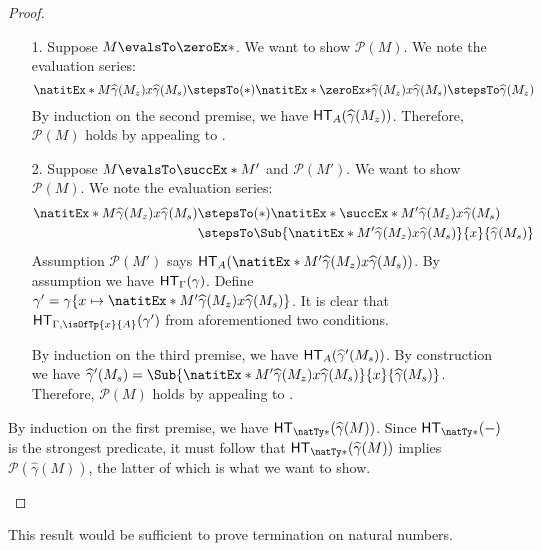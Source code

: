 \documentclass[letterpaper]{article}
\begin{document}
\begin{proof}
\begin{enumerate}
  \begin{enumerate}
    \item [1.] Suppose $M \evalsTo \zeroEx*$. We want to show $\mathcal{P}(M)$. We note the evaluation series:
    \[
      \natitEx*{M}{\widehat{\gamma}(M_z)}{x}{\widehat{\gamma}(M_s)} \stepsTo(*) \natitEx*{\zeroEx*}{\widehat{\gamma}(M_z)}{x}{\widehat{\gamma}(M_s)} \stepsTo \widehat{\gamma}(M_z)
    \]
    By induction on the second premise, we have $\HT[A](\widehat{\gamma}(M_z))$. Therefore, $\mathcal{P}(M)$ holds by appealing to .
    \item [2.] Suppose $M \evalsTo \succEx*{M'}$ and $\mathcal{P}(M')$. We want to show $\mathcal{P}(M)$. We note the evaluation series:
    \begin{align*}
      \natitEx*{M}{\widehat{\gamma}(M_z)}{x}{\widehat{\gamma}(M_s)}
      & \stepsTo(*) \natitEx*{\succEx*{M'}}{\widehat{\gamma}(M_z)}{x}{\widehat{\gamma}(M_s)} \\
      & \stepsTo \Sub{\natitEx*{M'}{\widehat{\gamma}(M_z)}{x}{\widehat{\gamma}(M_s)}}{x}{\widehat{\gamma}(M_s)}
    \end{align*}
    Assumption $\mathcal{P}(M')$ says $\HT[A](\natitEx*{M'}{\widehat{\gamma}(M_z)}{x}{\widehat{\gamma}(M_s)})$. By assumption we have $\HT[\Gamma](\gamma)$. Define $\gamma' = \gamma\{x \mapsto \natitEx*{M'}{\widehat{\gamma}(M_z)}{x}{\widehat{\gamma}(M_s)}\}$. It is clear that $\HT[\Gamma, \isOfTp{x}{A}](\gamma')$ from aforementioned two conditions.

    By induction on the third premise, we have $\HT[A](\widehat{\gamma}'(M_s))$. By construction we have $\widehat{\gamma}'(M_s) = \Sub{\natitEx*{M'}{\widehat{\gamma}(M_z)}{x}{\widehat{\gamma}(M_s)}}{x}{\widehat{\gamma}(M_s)}$.  Therefore, $\mathcal{P}(M)$ holds by appealing to .
  \end{enumerate}
  By induction on the first premise, we have $\HT[\natTy*](\widehat{\gamma}(M))$. Since $\HT[\natTy*](-)$ is the strongest predicate, it must follow that $\HT[\natTy*](\widehat{\gamma}(M))$ implies $\mathcal{P}(\widehat{\gamma}(M))$, the latter of which is what we want to show.
\end{enumerate}
\end{proof}

This result would be sufficient to prove termination on natural numbers.
\end{document}
